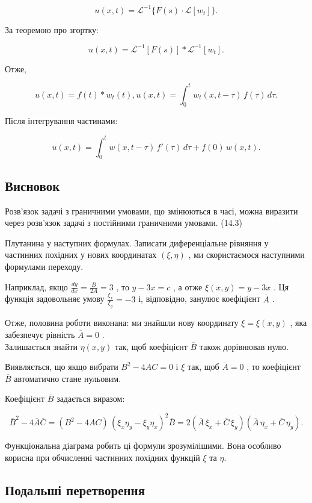 \documentclass[
  ukrainian,
]{article}
\begin{document}
\[
u(x, t) = \mathcal{L}^{-1}\{F(s)\cdot \mathcal{L}[w_t]\}.
\]

За теоремою про згортку:

\[
u(x, t) = \mathcal{L}^{-1}[F(s)] * \mathcal{L}^{-1}[w_t].
\]

Отже,

\[
u(x, t) = f(t) * w_t(t),
u(x, t) = \int_0^t w_t(x, t-\tau)\, f(\tau)\, d\tau.
\]

Після інтегрування частинами:

\[
u(x, t) = \int_{0}^{t} w(x, t-\tau)\, f'(\tau)\, d\tau + f(0)\, w(x, t).
\]

\subsection{Висновок}\label{ux432ux438ux441ux43dux43eux432ux43eux43a}

Розв'язок задачі з граничними умовами, що змінюються в часі, можна
виразити через розв'язок задачі з постійними граничними умовами. (14.3)

Плутанина у наступних формулах. Записати диференціальне рівняння у
частинних похідних у нових координатах \((\xi, \eta)\) , ми
скористаємося наступними формулами переходу.

Наприклад, якщо \(\frac{dy}{dx} = \frac{B}{2A} = 3\) , то \(y - 3x = c\)
, а отже \(\xi(x, y) = y - 3x\) . Ця функція задовольняє умову
\(\frac{\xi_x}{\xi_y} = -3\) і, відповідно, занулює коефіцієнт
\(\overline{A}\) .

Отже, половина роботи виконана: ми знайшли нову координату
\(\xi = \xi(x, y)\) , яка забезпечує рівність \(\overline{A} = 0\) .\\
Залишається знайти \(\eta(x, y)\) так, щоб коефіцієнт \(\overline{B}\)
також дорівнював нулю.

Виявляється, що якщо вибрати \(B^2 - 4AC = 0\) і \(\xi\) так, щоб
\(\overline{A} = 0\) , то коефіцієнт \(\overline{B}\) автоматично стане
нульовим.

Коефіцієнт \(\overline{B}\) задається виразом:

\[
\overline{B}^2 - 4\overline{A}\overline{C} = (B^2 - 4AC)\,(\xi_x \eta_y - \xi_y \eta_x)^2
\overline{B} = 2\left( \overline{A}\,\xi_x + \overline{C}\,\xi_y \right)
\left( \overline{A}\,\eta_x + \overline{C}\,\eta_y \right).
\]

Функціональна діаграма робить ці формули зрозумілішими. Вона особливо
корисна при обчисленні частинних похідних функцій \(\xi\) та \(\eta\).

\subsection{Подальші
перетворення}\label{ux43fux43eux434ux430ux43bux44cux448ux456-ux43fux435ux440ux435ux442ux432ux43eux440ux435ux43dux43dux44f}
\end{document}
